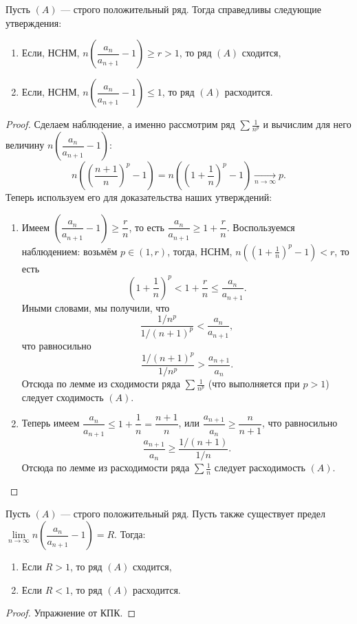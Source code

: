 \begin{theorem}[noob]
	Пусть \((A)\) --- строго положительный ряд. Тогда справедливы следующие утверждения:
	\begin{enumerate}
		\item Если, НСНМ, \(n \left(\dfrac{a_n}{a_{n+1}} - 1 \right) \geqslant r > 1\), то ряд \((A)\) сходится,
		\item Если, НСНМ, \(n \left(\dfrac{a_n}{a_{n+1}} - 1 \right) \leqslant 1\), то ряд \((A)\) расходится.
	\end{enumerate}
\end{theorem}
\begin{proof}
	Сделаем наблюдение, а именно рассмотрим ряд \(\sum \frac{1}{n^p}\) и вычислим для него величину \(n \left(\dfrac{a_n}{a_{n+1}} - 1 \right)\): \[
	n \left(\left(\frac{n + 1}{n} \right)^p - 1 \right) = n \left(\left(1 + \frac{1}{n}\right)^p - 1 \right) \xrightarrow[n \to \infty]{} p.
	\]
	Теперь используем его для доказательства наших утверждений:
	\begin{enumerate}
		\item Имеем \(\left(\dfrac{a_n}{a_{n+1}} - 1 \right) \geqslant \dfrac{r}{n}\), то есть \(\dfrac{a_n}{a_{n+1}} \geqslant 1 + \dfrac{r}{n}\). Воспользуемся наблюдением: возьмём \(p \in (1, r)\), тогда, НСНМ, \(n \left(\left(1 + \frac{1}{n}\right)^p - 1 \right) < r\), то есть \[
		\left(1 + \frac{1}{n}\right)^p < 1 + \frac{r}{n} \leqslant \dfrac{a_n}{a_{n+1}}.
		\]
		Иными словами, мы получили, что  \[
		\frac{1/n^p}{1/(n + 1)^p} < \frac{a_n}{a_{n+1}},
		\]
		что равносильно \[
		\frac{1/(n + 1)^p}{1/n^p} > \frac{a_{n+1}}{a_n}.
		\]
		Отсюда по лемме из сходимости ряда \(\sum \frac{1}{n^p}\) (что выполняется при \(p > 1\)) следует сходимость \((A)\).
		\item Теперь имеем \(\dfrac{a_n}{a_{n+1}} \leqslant 1 + \dfrac{1}{n} = \dfrac{n + 1}{n}\), или \(\dfrac{a_{n+1}}{a_n} \geqslant \dfrac{n}{n + 1}\), что равносильно \[
		\frac{a_{n+1}}{a_n} \geqslant \frac{1/(n + 1)}{1/n}.
		\]
		Отсюда по лемме из расходимости ряда \(\sum \frac{1}{n}\) следует расходимость \((A)\).
	\end{enumerate}
\end{proof}

\begin{corollary}
	Пусть \((A)\) --- строго положительный ряд. Пусть также существует предел \(\lim\limits_{n \to \infty} n \left(\dfrac{a_n}{a_{n+1}} - 1 \right) = R\). Тогда:
	\begin{enumerate}
		\item Если \(R > 1\), то ряд \((A)\) сходится,
		\item Если \(R < 1\), то ряд \((A)\) расходится.
	\end{enumerate}
\end{corollary}
\begin{proof}
	Упражнение от КПК.
\end{proof}

